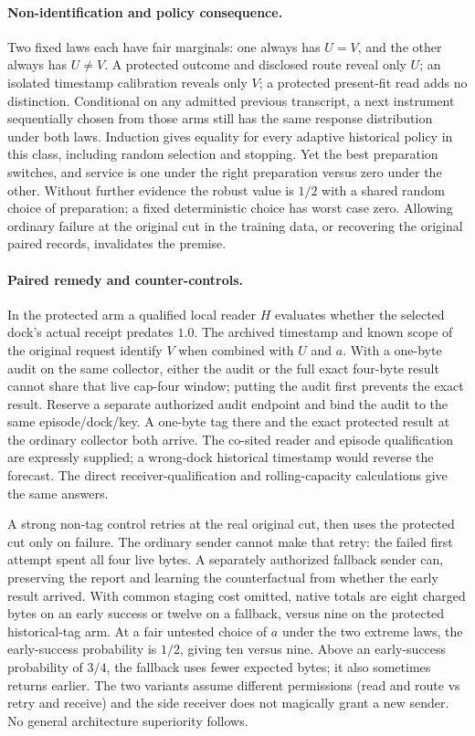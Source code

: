 \documentclass{article}
\begin{document}
\paragraph{Non-identification and policy consequence.}
Two fixed laws each have fair marginals: one always has \(U=V\),
and the other always has \(U\ne V\). A protected outcome and disclosed
route reveal only \(U\); an isolated timestamp calibration reveals only
\(V\); a protected present-fit read adds no distinction. Conditional on
any admitted previous transcript, a next instrument sequentially
chosen from those arms still has the same response distribution under
both laws. Induction gives equality for every adaptive historical
policy in this class, including random selection and stopping.
Yet the best preparation switches, and service is one under the right
preparation versus zero under the other. Without further evidence
the robust value is \(1/2\) with a shared random choice of
preparation; a fixed deterministic choice has worst case zero.
Allowing ordinary failure at the original cut in the training data,
or recovering the original paired records, invalidates the premise.

\paragraph{Paired remedy and counter-controls.}
In the protected arm a qualified local reader \(H\) evaluates whether
the selected dock's actual receipt predates \(1.0\).
The archived timestamp and known scope of the original request
identify \(V\) when combined with \(U\) and \(a\).
With a one-byte audit on the same collector, either the audit or
the full exact four-byte result cannot share that live cap-four
window; putting the audit first prevents the exact result.
Reserve a separate authorized audit endpoint and bind the audit
to the same episode/dock/key. A one-byte tag there and the exact
protected result at the ordinary collector both arrive. The
co-sited reader and episode qualification are expressly supplied;
a wrong-dock historical timestamp would reverse the forecast.
The direct receiver-qualification and rolling-capacity calculations
give the same answers.

A strong non-tag control retries at the real original cut, then uses
the protected cut only on failure. The ordinary sender cannot make
that retry: the failed first attempt spent all four live bytes.
A separately authorized fallback sender can, preserving the report
and learning the counterfactual from whether the early result arrived.
With common staging cost omitted, native totals are eight charged
bytes on an early success or twelve on a fallback, versus nine on
the protected historical-tag arm. At a fair untested choice of
\(a\) under the two extreme laws, the early-success probability is
\(1/2\), giving ten versus nine. Above an early-success probability
of \(3/4\), the fallback uses fewer expected bytes; it also sometimes
returns earlier. The two variants assume different permissions
(read and route vs retry and receive) and the side receiver does not
magically grant a new sender. No general architecture superiority
follows.
\end{document}
